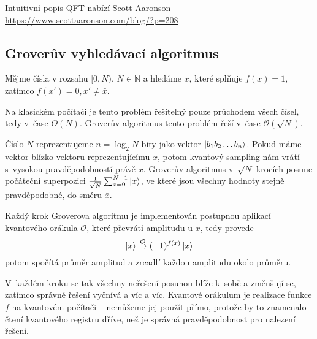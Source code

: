 Intuitivní popis QFT nabízí Scott Aaronson \\
\href{https://www.scottaaronson.com/blog/?p=208}{https://www.scottaaronson.com/blog/?p=208}


\subsection{Groverův vyhledávací algoritmus}



Mějme čísla v rozsahu $[0, N)$, $N \in \mathbb{N}$ a hledáme
$\bar x$, které splňuje $f(\bar x) = 1$, zatímco $f(x') = 0, x' \neq
\bar x$.

Na klasickém počítači je tento problém řešitelný pouze průchodem všech
čísel, tedy v~čase $\Theta(N)$.
Groverův algoritmus tento problém řeší v~čase $\mathcal{O}(\sqrt{N})$.

Číslo $N$ reprezentujeme $n = \log_2 N$ bity jako vektor
$\ket{b_1 b_2 \ldots b_n}$. Pokud máme vektor blízko vektoru
reprezentujícímu $x$, potom kvantový sampling nám vrátí s~vysokou
pravděpodobností právě $x$. Groverův algoritmus v~$\sqrt{N}$ krocích
posune počáteční superpozici $\frac{1}{\sqrt{N}} \sum_{x = 0}^{N-1}
\ket{x}$, ve které jsou všechny hodnoty stejně pravděpodobné,
do směru $\bar x$.

Každý krok Groverova algoritmu je implementován postupnou aplikací
kvantového orákula $\mathcal{O}$, které převrátí amplitudu u $\bar x$,
tedy provede
\[
    \ket{x} \stackrel{\mathcal{O}}{\to} (-1)^{f(x)} \ket{x}
\]
potom spočítá průměr amplitud a zrcadlí každou amplitudu okolo průměru.

V~každém kroku se tak všechny neřešení posunou blíže k~sobě a změnšují
se, zatímco správné řešení vyčnívá a víc a víc. Kvantové orákulum je
realizace funkce $f$ na kvantovém počítači -- nemůžeme jej použít přímo,
protože by to znamenalo čtení kvantového registru dříve, než je správná
pravděpodobnost pro nalezení řešení.
